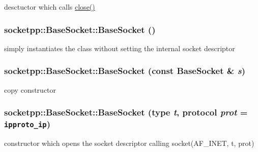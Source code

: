 desctuctor which calls \hyperlink{classsocketpp_1_1BaseSocket_f067195056bb6b5a65c4bc1d2ac7da72}{close()} 

\hypertarget{classsocketpp_1_1BaseSocket_3eb81ecbf94ce83afa6b2f60206c77f2}{
\subsubsection[{BaseSocket}]{\setlength{\rightskip}{0pt plus 5cm}socketpp::BaseSocket::BaseSocket ()}}
\label{classsocketpp_1_1BaseSocket_3eb81ecbf94ce83afa6b2f60206c77f2}


simply instantiates the class without setting the internal socket descriptor 

\hypertarget{classsocketpp_1_1BaseSocket_0c142db99422572579c91f3e176035c6}{
\subsubsection[{BaseSocket}]{\setlength{\rightskip}{0pt plus 5cm}socketpp::BaseSocket::BaseSocket (const {\bf BaseSocket} \& {\em s})}}
\label{classsocketpp_1_1BaseSocket_0c142db99422572579c91f3e176035c6}


copy constructor 

\hypertarget{classsocketpp_1_1BaseSocket_35c982d7aef2041c100439cf38aa7f4d}{
\subsubsection[{BaseSocket}]{\setlength{\rightskip}{0pt plus 5cm}socketpp::BaseSocket::BaseSocket ({\bf type} {\em t}, \/  {\bf protocol} {\em prot} = {\tt ipproto\_\-ip})}}
\label{classsocketpp_1_1BaseSocket_35c982d7aef2041c100439cf38aa7f4d}


constructor which opens the socket descriptor calling socket(AF\_\-INET, t, prot) 

